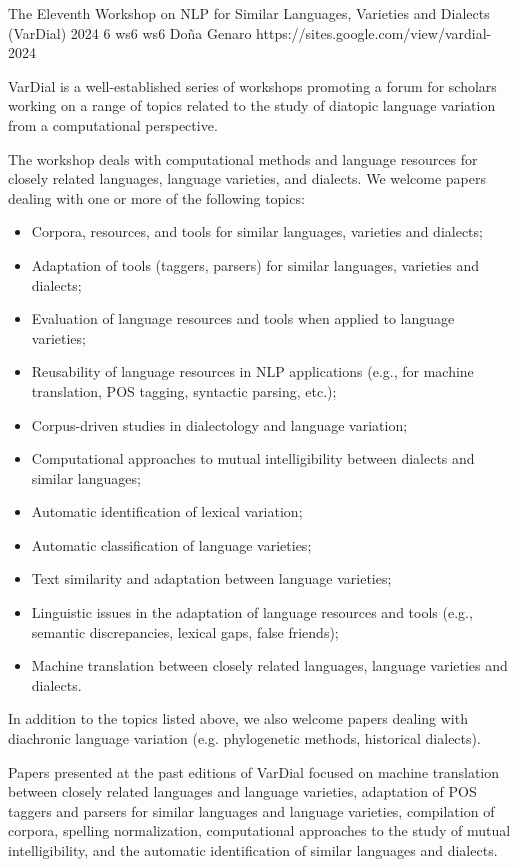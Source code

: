 \begin{wsschedulenolist}
{The Eleventh Workshop on NLP for Similar Languages, Varieties and Dialects (VarDial) 2024}
{6}
{ws6}
{ws6}
{Do\~na Genaro}
{https://sites.google.com/view/vardial-2024}

VarDial is a well-established series of workshops promoting a forum for scholars working on a range of topics related to the study of diatopic language variation from a computational perspective.

The workshop deals with computational methods and language resources for closely related languages, language varieties, and dialects. We welcome papers dealing with one or more of the following topics:

\begin{itemize}
    \setlength{\itemsep}{-0.3ex}
    \item Corpora, resources, and tools for similar languages, varieties and dialects;
    \item Adaptation of tools (taggers, parsers) for similar languages, varieties and dialects;
    \item Evaluation of language resources and tools when applied to language varieties;
    \item Reusability of language resources in NLP applications (e.g., for machine translation, POS tagging, syntactic parsing, etc.);
    \item Corpus-driven studies in dialectology and language variation;
    \item Computational approaches to mutual intelligibility between dialects and similar languages;
    \item Automatic identification of lexical variation;
    \item Automatic classification of language varieties;
    \item Text similarity and adaptation between language varieties;
    \item Linguistic issues in the adaptation of language resources and tools (e.g., semantic discrepancies, lexical gaps, false friends);
    \item Machine translation between closely related languages, language varieties and dialects.
\end{itemize}

In addition to the topics listed above, we also welcome papers dealing with diachronic language variation (e.g. phylogenetic methods, historical dialects).

Papers presented at the past editions of VarDial focused on machine translation between closely related languages and language varieties, adaptation of POS taggers and parsers for similar languages and language varieties, compilation of corpora, spelling normalization, computational approaches to the study of mutual intelligibility, and the automatic identification of similar languages and dialects.



\end{wsschedulenolist}
